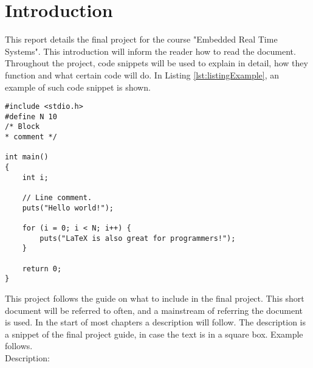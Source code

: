 \section{Introduction}

This report details the final project for the course "Embedded Real Time Systems". This introduction will inform the reader how to read the document. \\

Throughout the project, code snippets will be used to explain in detail, how they function and what certain code will do. In Listing \ref{lst:listingExample}, an example of such code snippet is shown.

\begin{lstlisting}[style=customc++, label={lst:listingExample}, caption={Example listing.}]
#include <stdio.h>
#define N 10
/* Block
* comment */

int main()
{
	int i;

	// Line comment.
	puts("Hello world!");

	for (i = 0; i < N; i++) {
		puts("LaTeX is also great for programmers!");
	}

	return 0;
}
\end{lstlisting}

This project follows the guide on what to include in the final project\cite{Bjerge2017}. This short document will be referred to often, and a mainstream of referring the document is used. In the start of most chapters a description will follow. The description is a snippet of the final project guide, in case the text is in a square box. Example follows.\\

Description:

\noindent{}